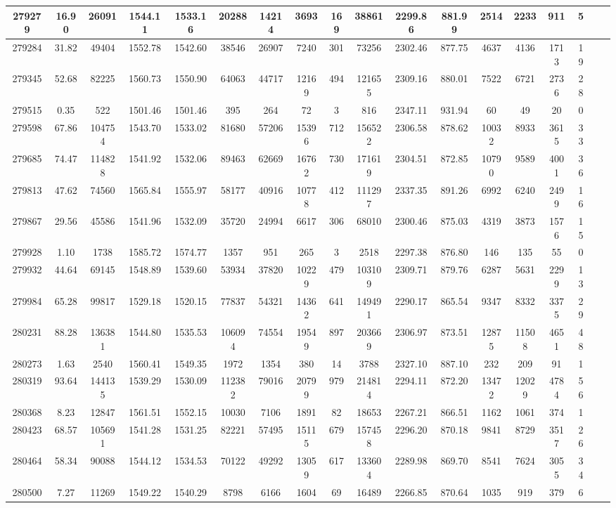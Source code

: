 \documentclass[10pt]{extarticle}
\begin{document}
\begin{longtable}{|c|c|c|c|c|c|c|c|c|c|c|c|c|c|c|c|c|c|}
\hline 
279279&16.90&26091&1544.11&1533.16&20288&14214&3693&169&38861&2299.86&881.99&2514&2233&911&5 \\ 
\hline 
279284&31.82&49404&1552.78&1542.60&38546&26907&7240&301&73256&2302.46&877.75&4637&4136&1713&19 \\ 
\hline 
279345&52.68&82225&1560.73&1550.90&64063&44717&12169&494&121655&2309.16&880.01&7522&6721&2736&28 \\ 
\hline 
279515&0.35&522&1501.46&1501.46&395&264&72&3&816&2347.11&931.94&60&49&20&0 \\ 
\hline 
279598&67.86&104754&1543.70&1533.02&81680&57206&15396&712&156522&2306.58&878.62&10032&8933&3615&33 \\ 
\hline 
279685&74.47&114828&1541.92&1532.06&89463&62669&16762&730&171619&2304.51&872.85&10790&9589&4001&36 \\ 
\hline 
279813&47.62&74560&1565.84&1555.97&58177&40916&10778&412&111297&2337.35&891.26&6992&6240&2499&16 \\ 
\hline 
279867&29.56&45586&1541.96&1532.09&35720&24994&6617&306&68010&2300.46&875.03&4319&3873&1576&15 \\ 
\hline 
279928&1.10&1738&1585.72&1574.77&1357&951&265&3&2518&2297.38&876.80&146&135&55&0 \\ 
\hline 
279932&44.64&69145&1548.89&1539.60&53934&37820&10229&479&103109&2309.71&879.76&6287&5631&2299&13 \\ 
\hline 
279984&65.28&99817&1529.18&1520.15&77837&54321&14362&641&149491&2290.17&865.54&9347&8332&3375&29 \\ 
\hline 
280231&88.28&136381&1544.80&1535.53&106094&74554&19549&897&203669&2306.97&873.51&12875&11508&4651&48 \\ 
\hline 
280273&1.63&2540&1560.41&1549.35&1972&1354&380&14&3788&2327.10&887.10&232&209&91&1 \\ 
\hline 
280319&93.64&144135&1539.29&1530.09&112382&79016&20799&979&214814&2294.11&872.20&13472&12029&4784&56 \\ 
\hline 
280368&8.23&12847&1561.51&1552.15&10030&7106&1891&82&18653&2267.21&866.51&1162&1061&374&1 \\ 
\hline 
280423&68.57&105691&1541.28&1531.25&82221&57495&15115&679&157458&2296.20&870.18&9841&8729&3517&26 \\ 
\hline 
280464&58.34&90088&1544.12&1534.53&70122&49292&13059&617&133604&2289.98&869.70&8541&7624&3055&34 \\ 
\hline 
280500&7.27&11269&1549.22&1540.29&8798&6166&1604&69&16489&2266.85&870.64&1035&919&379&6 \\ 

\end{longtable}
\end{document}
